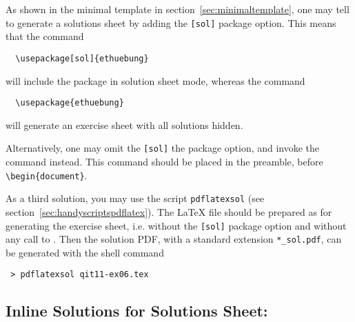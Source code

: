 \documentclass[11pt,a4paper]{article}
\begin{document}
As shown in the minimal template in section~\ref{sec:minimaltemplate}, one may tell
\ethuebung{} to generate a solutions sheet by adding the \texttt{[sol]} package
option. This means that the command
{\setlength\pkgverbatimoutsidespacing{-3mm}
\begin{pkgverbatim}[-6mm]
\begin{verbatim}
  \usepackage[sol]{ethuebung}
\end{verbatim}
\end{pkgverbatim}}
will include the \ethuebung{} package in solution sheet mode, whereas the command
{\setlength\pkgverbatimoutsidespacing{-3mm}
\begin{pkgverbatim}[-6mm]
\begin{verbatim}
  \usepackage{ethuebung}
\end{verbatim}
\end{pkgverbatim}}
will generate an exercise sheet with all solutions hidden.

Alternatively, one may omit the \texttt{[sol]} the package option, and invoke the
 command instead. This command should be placed in the
preamble, before \verb|\begin{document}|.



As a third solution, you may use the script \texttt{pdflatexsol} (see
section~\ref{sec:handyscriptspdflatex}). The \LaTeX{} file should 
be prepared as for generating the exercise sheet, i.e. without the \texttt{[sol]} package
option and without any call to . Then the solution PDF,
with a standard extension \verb|*_sol.pdf|, can be generated with the shell command
\begin{pkgverbatim}
\begin{verbatim}
 > pdflatexsol qit11-ex06.tex
\end{verbatim}
\end{pkgverbatim}



\subsection{Inline Solutions for Solutions Sheet: }
\end{document}
